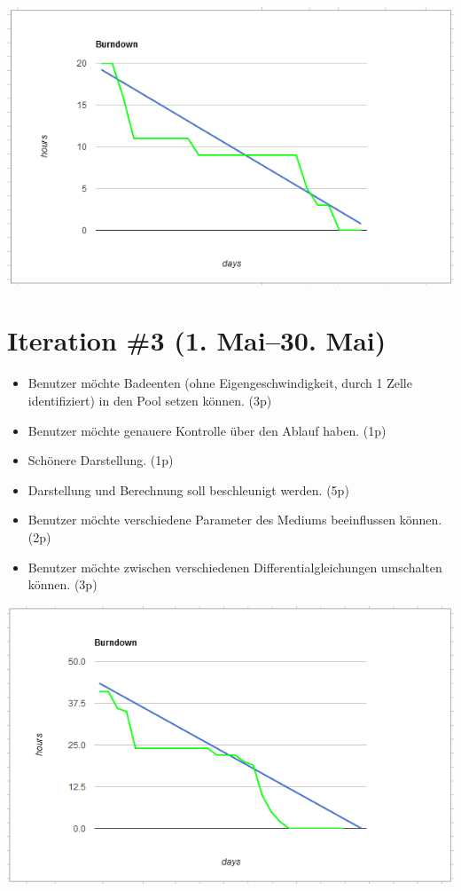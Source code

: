 \documentclass[11pt]{report} %
\theoremstyle{definition}
\begin{document}
\begin{appendix}
\includegraphics[scale=0.7]{burndowns/two.png}

\section{Iteration \#3 (1. Mai--30. Mai)}

\begin{itemize}
\item Benutzer möchte Badeenten (ohne Eigengeschwindigkeit, durch 1 Zelle identifiziert) in den Pool setzen können. (3p) 
\item Benutzer möchte genauere Kontrolle über den Ablauf haben. (1p) 
\item Schönere Darstellung. (1p) 
\item Darstellung und Berechnung soll beschleunigt werden. (5p)
\item Benutzer möchte verschiedene Parameter des Mediums beeinflussen können. (2p) 
\item Benutzer möchte zwischen verschiedenen Differentialgleichungen umschalten können. (3p)
\end{itemize}

\includegraphics[scale=0.7]{burndowns/three.png}


\end{appendix}
\end{document}
